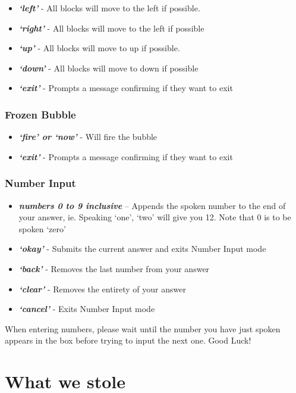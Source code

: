 \documentclass[11pt, oneside]{article}
\begin{document}
\begin{itemize}
	\item {\em\bf`left'} - All blocks will move to the left if possible. 
	\item {\em\bf`right'} - All blocks will move to the left if possible
	\item {\em\bf`up'} - All blocks will move to up if possible. 
	\item {\em\bf`down'} - All blocks will move to down if possible
	\item {\em\bf`exit'} - Prompts a message confirming if they want to exit
	
\end{itemize}

\subsubsection{Frozen Bubble}

\begin{itemize}
	\item {\em\bf`fire' or `now'} - Will fire the bubble
	\item {\em\bf`exit'} - Prompts a message confirming if they want to exit
	
\end{itemize}

\pagebreak

\subsubsection{Number Input}
\begin{itemize}
  \item {\em\bf numbers 0 to 9 inclusive} – Appends the spoken number
    to the end of your answer, ie. Speaking `one', `two' will give you
    12. Note that 0 is to be spoken `zero'
  \item {\em\bf `okay'} - Submits the current answer and exits Number
    Input mode
  \item {\em\bf `back'} - Removes the last number from your answer
  \item {\em\bf `clear'} - Removes the entirety of your answer
  \item {\em\bf `cancel'} - Exits Number Input mode
\end{itemize}

When entering numbers, please wait until the number you have just spoken appears
in the box before trying to input the next one.
Good Luck!

\section{What we stole}
\end{document}
